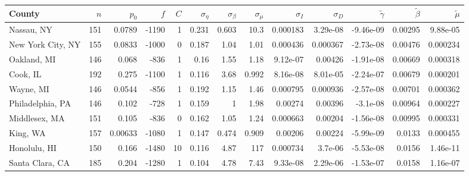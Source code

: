 \documentclass[12pt,letterpaper]{article}
\begin{document}
\begin{appendices}
\begin{sidewaystable}
{\begin{tabular}{lrrrrrrrrrrrr}
\hline
 County             &   $n$ &   $p_0$ &   $f$ &   $C$ &   $\sigma_\eta$ &   $\sigma_\beta$ &   $\sigma_\mu$ &   $\sigma_I$ &   $\sigma_D$ &   $\tilde\gamma$ &   $\tilde{\beta}$ &   $\tilde{\mu}$ \\
\hline
 Nassau, NY         & 151   & 0.0789  & -1190 &     1 &           0.231 &            0.603 &         10.3   &    0.000183  &     3.29e-08 &        -9.46e-09 &           0.00295 &       9.88e-05  \\
 New York City, NY  & 155   & 0.0833  & -1000 &     0 &           0.187 &            1.04  &          1.01  &    0.000436  &     0.000367 &        -2.73e-08 &           0.00476 &       0.000234  \\
 Oakland, MI        & 146   & 0.068   &  -836 &     1 &           0.16  &            1.55  &          1.18  &    9.12e-07  &     0.00426  &        -1.91e-08 &           0.00669 &       0.000318  \\
 Cook, IL           & 192   & 0.275   & -1100 &     1 &           0.116 &            3.68  &          0.992 &    8.16e-08  &     8.01e-05 &        -2.24e-07 &           0.00679 &       0.000201  \\
 Wayne, MI          & 146   & 0.0544  &  -856 &     1 &           0.192 &            1.15  &          1.46  &    0.000795  &     0.000936 &        -2.57e-08 &           0.00701 &       0.000362  \\
 Philadelphia, PA   & 146   & 0.102   &  -728 &     1 &           0.159 &            1     &          1.98  &    0.00274   &     0.00396  &        -3.1e-08  &           0.00964 &       0.000227  \\
 Middlesex, MA      & 151   & 0.105   &  -836 &     0 &           0.162 &            1.05  &          1.24  &    0.000663  &     0.00204  &        -1.56e-08 &           0.00995 &       0.000331  \\
 King, WA           & 157   & 0.00633 & -1080 &     1 &           0.147 &            0.474 &          0.909 &    0.00206   &     0.00224  &        -5.99e-09 &           0.0133  &       0.000455  \\
 Honolulu, HI       & 150   & 0.166   & -1480 &    10 &           0.116 &            4.87  &        117     &    0.000734  &     3.7e-06  &        -5.53e-08 &           0.0156  &       1.46e-11  \\
 Santa Clara, CA    & 185   & 0.204   & -1280 &     1 &           0.104 &            4.78  &          7.43  &    9.33e-08  &     2.29e-06 &        -1.53e-07 &           0.0158  &       1.16e-07  \\

\end{tabular}}
\end{sidewaystable}
\end{appendices}
\end{document}
